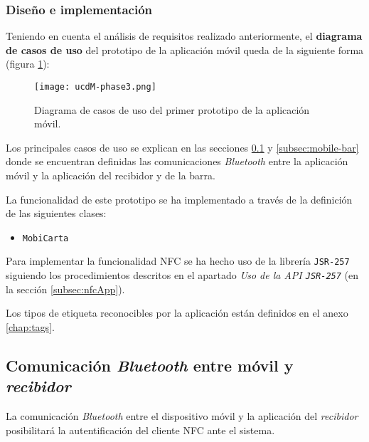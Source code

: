 \subsubsection{Diseño e implementación}
Teniendo en cuenta el análisis de requisitos realizado anteriormente, el
\textbf{diagrama de casos de uso} del prototipo de la aplicación móvil queda
de la siguiente forma (figura \ref{fig:ucdM-phase3}):

  \begin{figure}[H]
    \begin{center}
      \texttt{[image: ucdM-phase3.png]}
      \caption{Diagrama de casos de uso del primer prototipo de la aplicación
      móvil.}
      \label{fig:ucdM-phase3}
    \end{center}
  \end{figure}

Los principales casos de uso se explican en las secciones
\ref{subsec:mobile-receiver} y \ref{subsec:mobile-bar} donde se encuentran
definidas las comunicaciones \emph{Bluetooth} entre la aplicación móvil y
la aplicación del recibidor y de la barra.

La funcionalidad de este prototipo se ha implementado a través de la
definición de las siguientes clases:
\begin{itemize}
\item \texttt{MobiCarta}
\end{itemize}

Para implementar la funcionalidad \acs{NFC} se ha hecho uso de la
librería \texttt{\acs{JSR}-257} siguiendo los procedimientos descritos en el 
apartado \emph{Uso de la \acs{API} \texttt{\acs{JSR}-257}} (en la sección
\ref{subsec:nfcApp}).

Los tipos de etiqueta reconocibles por la aplicación están definidos en el 
anexo \ref{chap:tags}.

\subsection{Comunicación \emph{Bluetooth} entre móvil y \emph{recibidor}}
\label{subsec:mobile-receiver}
La comunicación \emph{Bluetooth} entre el dispositivo móvil y la aplicación
del \emph{recibidor} posibilitará la autentificación del cliente \acs{NFC}
ante el sistema.

